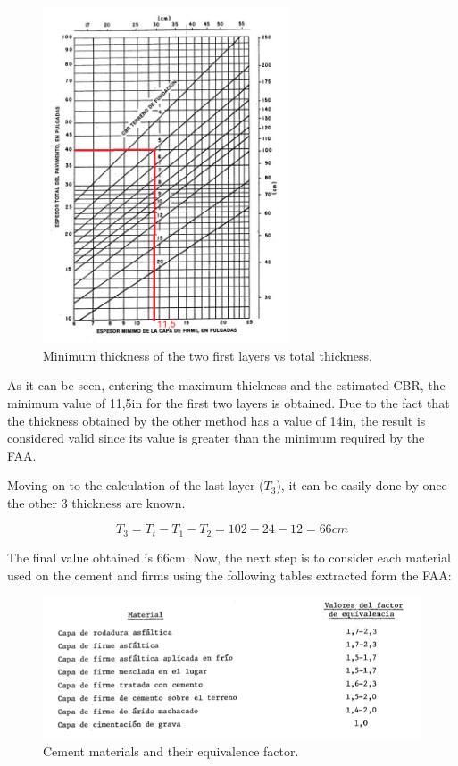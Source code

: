 		\begin{figure}[H]
			\centering
			\includegraphics[clip, trim=0cm 0cm 0cm 0cm, width=0.65\textwidth]{./images/pavement/B737/thickness2min}
			\caption{Minimum thickness of the two first layers vs total thickness.}
			\label{} %
		\end{figure}
		
		As it can be seen, entering the maximum thickness and the estimated CBR, the minimum value of 11,5in for the first two layers is obtained. Due to the fact that the thickness obtained by the other method has a value of 14in, the result is considered valid since its value is greater than the minimum required by the FAA.
		
		Moving on to the calculation of the last layer (\(T_3\)), it can be easily done by once the other 3 thickness are known. 
		
		\[T_3 = T_t - T_1 - T_2 = 102 - 24 - 12 = 66cm\]
		
		The final value obtained is 66cm. Now, the next step is to consider each material used on the cement and firms using the following tables extracted form the FAA:
		
		\begin{figure}[H]
			\centering
			\includegraphics[clip, trim=0cm 0cm 0cm 0cm, width=1\textwidth]{./images/pavement/cemento}
			\caption{Cement materials and their equivalence factor.}
			\label{} %
		\end{figure}
		
